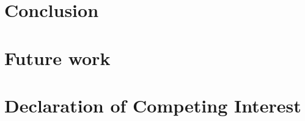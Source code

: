 \section{Conclusion} \label{Conclusion}

\section{Future work}

\section{Declaration of Competing Interest}

